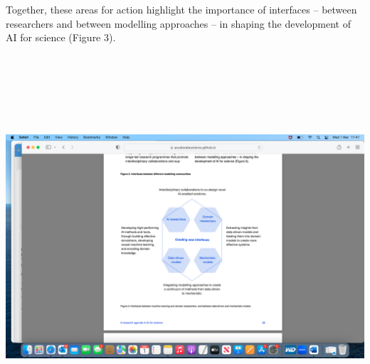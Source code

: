Together, these areas for action highlight the importance of interfaces
-- between researchers and between modelling approaches -- in shaping
the development of AI for science (Figure 3).

\includegraphics[width=5.98951in,height=5.6132in]{media/image3.png}

